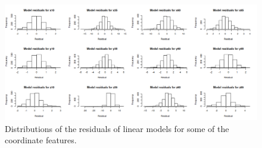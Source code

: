 \documentclass[11pt,fleqn]{article}
\begin{document}
\begin{figure}[H]
	\centering
	\includegraphics[width=.9\textwidth]{residuals}
	\caption{Distributions of the residuals of linear models for some of the coordinate features.}\label{fig:residuals}
\end{figure}
\end{document}
